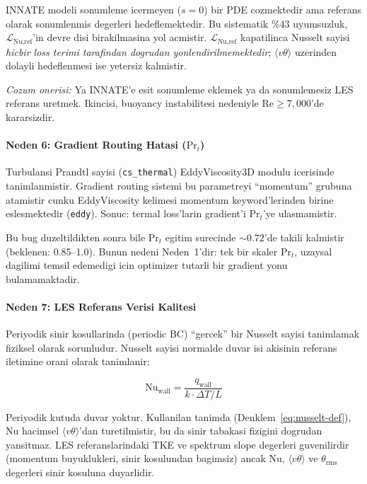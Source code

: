 INNATE modeli sonumleme icermeyen ($s = 0$) bir PDE cozmektedir ama referans
olarak sonumlenmis degerleri hedeflemektedir. Bu sistematik \%43 uyumsuzluk,
$\mathcal{L}_\text{Nu,ref}$'in devre disi birakilmasina yol acmistir.
$\mathcal{L}_\text{Nu,ref}$ kapatilinca Nusselt sayisi \emph{hicbir loss
terimi tarafindan dogrudan yonlendirilmemektedir}; $\langle v\theta \rangle$
uzerinden dolayli hedeflenmesi ise yetersiz kalmistir.

\emph{Cozum onerisi:} Ya INNATE'e esit sonumleme eklemek ya da sonumlemesiz
LES referans uretmek. Ikincisi, buoyancy instabilitesi nedeniyle
$\text{Re} \geq 7{,}000$'de kararsizdir.


\paragraph{Neden 6: Gradient Routing Hatasi ($\text{Pr}_t$)}

Turbulansi Prandtl sayisi (\texttt{cs\_thermal}) EddyViscosity3D modulu
icerisinde tanimlanmistir. Gradient routing sistemi bu parametreyi
``momentum'' grubuna atamistir cunku EddyViscosity kelimesi momentum
keyword'lerinden birine eslesmektedir (\texttt{eddy}). Sonuc: termal loss'larin
gradient'i $\text{Pr}_t$'ye ulasmamistir.

Bu bug duzeltildikten sonra bile $\text{Pr}_t$ egitim surecinde $\sim 0.72$'de
takili kalmistir (beklenen: 0.85--1.0). Bunun nedeni Neden~1'dir:
tek bir skaler $\text{Pr}_t$, uzaysal dagilimi temsil edemedigi icin
optimizer tutarli bir gradient yonu bulamamaktadir.


\paragraph{Neden 7: LES Referans Verisi Kalitesi}

Periyodik sinir kosullarinda (periodic BC) ``gercek'' bir Nusselt sayisi
tanimlamak fiziksel olarak sorunludur. Nusselt sayisi normalde duvar isi
akisinin referans iletimine orani olarak tanimlanir:

\begin{equation}
  \text{Nu}_\text{wall} = \frac{q_\text{wall}}{k \cdot \Delta T / L}
  \label{eq:nu-wall}
\end{equation}

Periyodik kutuda duvar yoktur. Kullanilan tanimda (Denklem~\ref{eq:nusselt-def}),
$\text{Nu}$ hacimsel $\langle v\theta \rangle$'dan turetilmistir, bu da
sinir tabakasi fizigini dogrudan yansitmaz. LES referanslarindaki TKE ve
spektrum slope degerleri guvenilirdir (momentum buyuklukleri, sinir
kosulundan bagimsiz) ancak Nu, $\langle v\theta \rangle$ ve $\theta_\text{rms}$
degerleri sinir kosuluna duyarlidir.


